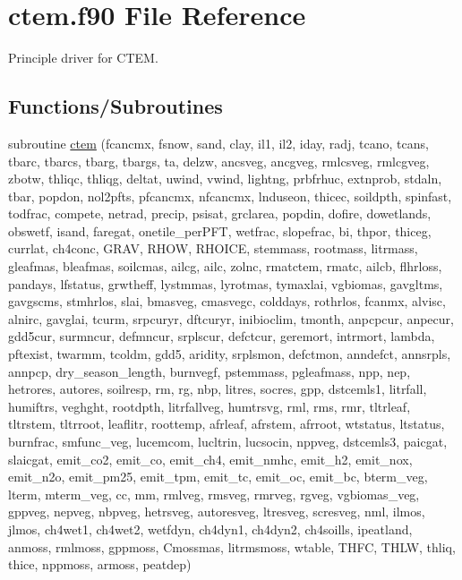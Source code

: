 \hypertarget{ctem_8f90}{}\section{ctem.\+f90 File Reference}
\label{ctem_8f90}


Principle driver for C\+T\+E\+M.  


\subsection*{Functions/\+Subroutines}
\begin{DoxyCompactItemize}
\item 
subroutine \hyperlink{ctem_8f90_a13ba037da8ed72b5b014f08f8be649ed}{ctem} (fcancmx, fsnow, sand, clay, il1, il2, iday, radj, tcano, tcans, tbarc, tbarcs, tbarg, tbargs, ta, delzw, ancsveg, ancgveg, rmlcsveg, rmlcgveg, zbotw, thliqc, thliqg, deltat, uwind, vwind, lightng, prbfrhuc, extnprob, stdaln, tbar, popdon, nol2pfts, pfcancmx, nfcancmx, lnduseon, thicec, soildpth, spinfast, todfrac, compete, netrad, precip, psisat, grclarea, popdin, dofire, dowetlands, obswetf, isand, faregat, onetile\+\_\+per\+P\+F\+T, wetfrac, slopefrac, bi, thpor, thiceg, currlat, ch4conc, G\+R\+A\+V, R\+H\+O\+W, R\+H\+O\+I\+C\+E, stemmass, rootmass, litrmass, gleafmas, bleafmas, soilcmas, ailcg, ailc, zolnc, rmatctem, rmatc, ailcb, flhrloss, pandays, lfstatus, grwtheff, lystmmas, lyrotmas, tymaxlai, vgbiomas, gavgltms, gavgscms, stmhrlos, slai, bmasveg, cmasvegc, colddays, rothrlos, fcanmx, alvisc, alnirc, gavglai, tcurm, srpcuryr, dftcuryr, inibioclim, tmonth, anpcpcur, anpecur, gdd5cur, surmncur, defmncur, srplscur, defctcur, geremort, intrmort, lambda, pftexist, twarmm, tcoldm, gdd5, aridity, srplsmon, defctmon, anndefct, annsrpls, annpcp, dry\+\_\+season\+\_\+length, burnvegf, pstemmass, pgleafmass, npp, nep, hetrores, autores, soilresp, rm, rg, nbp, litres, socres, gpp, dstcemls1, litrfall, humiftrs, veghght, rootdpth, litrfallveg, humtrsvg, rml, rms, rmr, tltrleaf, tltrstem, tltrroot, leaflitr, roottemp, afrleaf, afrstem, afrroot, wtstatus, ltstatus, burnfrac, smfunc\+\_\+veg, lucemcom, lucltrin, lucsocin, nppveg, dstcemls3, paicgat, slaicgat, emit\+\_\+co2, emit\+\_\+co, emit\+\_\+ch4, emit\+\_\+nmhc, emit\+\_\+h2, emit\+\_\+nox, emit\+\_\+n2o, emit\+\_\+pm25, emit\+\_\+tpm, emit\+\_\+tc, emit\+\_\+oc, emit\+\_\+bc, bterm\+\_\+veg, lterm, mterm\+\_\+veg, cc, mm, rmlveg, rmsveg, rmrveg, rgveg, vgbiomas\+\_\+veg, gppveg, nepveg, nbpveg, hetrsveg, autoresveg, ltresveg, scresveg, nml, ilmos, jlmos, ch4wet1, ch4wet2, wetfdyn, ch4dyn1, ch4dyn2, ch4soills, ipeatland, anmoss, rmlmoss, gppmoss, Cmossmas, litrmsmoss, wtable, T\+H\+F\+C, T\+H\+L\+W, thliq, thice, nppmoss, armoss, peatdep)
\end{DoxyCompactItemize}



